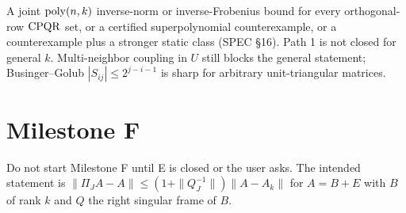 \begin{conjecture}
\label{conj:e-open}
\notready
{}
A joint $\mathrm{poly}(n,k)$ inverse-norm or inverse-Frobenius bound for every
orthogonal-row $\mathrm{CPQR}$ set, or a certified superpolynomial counterexample,
or a counterexample plus a stronger static class (SPEC §16). Path 1 is not
closed for general $k$. Multi-neighbor coupling in $U$ still blocks the
general statement; Businger--Golub $|S_{ij}|\le 2^{j-i-1}$ is sharp for
arbitrary unit-triangular matrices.
\end{conjecture}

\section{Milestone F}

\begin{conjecture}
\label{conj:f-open}
\notready
Do not start Milestone F until E is closed or the user asks. The intended
statement is $\|\Pi_J A-A\|\le(1+\|Q_J^{-1}\|)\|A-A_k\|$ for $A=B+E$ with
$B$ of rank $k$ and $Q$ the right singular frame of $B$.
\end{conjecture}
